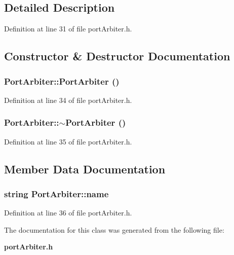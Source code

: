 \subsection{Detailed Description}


Definition at line 31 of file portArbiter.h.

\subsection{Constructor \& Destructor Documentation}
\subsubsection[{PortArbiter}]{\setlength{\rightskip}{0pt plus 5cm}PortArbiter::PortArbiter ()\hspace{0.3cm}{\tt  [inline]}}\label{classPortArbiter_4c3557fe1dda9d5861d2d21b3698e67c}




Definition at line 34 of file portArbiter.h.
\subsubsection[{$\sim$PortArbiter}]{\setlength{\rightskip}{0pt plus 5cm}PortArbiter::$\sim$PortArbiter ()\hspace{0.3cm}{\tt  [inline]}}\label{classPortArbiter_96aa09e1d40630906ffe56fbca7cd984}




Definition at line 35 of file portArbiter.h.

\subsection{Member Data Documentation}
\subsubsection[{name}]{\setlength{\rightskip}{0pt plus 5cm}string {\bf PortArbiter::name}}\label{classPortArbiter_0a44c855daa1f7b41013a5c09ab27f95}




Definition at line 36 of file portArbiter.h.

The documentation for this class was generated from the following file:\begin{CompactItemize}
\item 
{\bf portArbiter.h}\end{CompactItemize}
